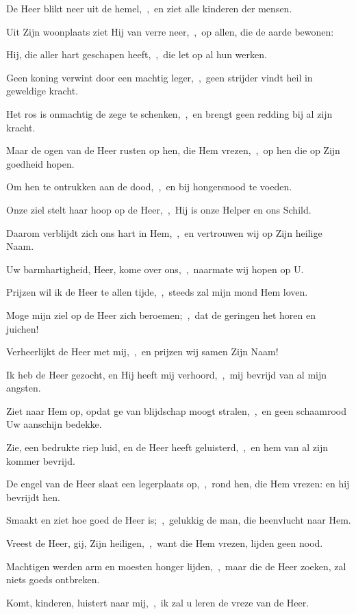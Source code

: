 \documentclass[12pt,twoside,a5paper]{article}
\begin{document}
\begin{halfparskip}
  De Heer blikt neer uit de hemel,~\sep\ en ziet alle kinderen der mensen.

  Uit Zijn woonplaats ziet Hij van verre neer,~\sep\ op allen, die de aarde bewonen:

  Hij, die aller hart geschapen heeft,~\sep\ die let op al hun werken.

  Geen koning verwint door een machtig leger,~\sep\ geen strijder vindt heil in geweldige kracht.

  Het ros is onmachtig de zege te schenken,~\sep\ en brengt geen redding bij al zijn kracht.

  Maar de ogen van de Heer rusten op hen, die Hem vrezen,~\sep\ op hen die op Zijn goedheid hopen.

  Om hen te ontrukken aan de dood,~\sep\ en bij hongersnood te voeden.

  Onze ziel stelt haar hoop op de Heer,~\sep\ Hij is onze Helper en ons Schild.

  Daarom verblijdt zich ons hart in Hem,~\sep\ en vertrouwen wij op Zijn heilige Naam.

  Uw barmhartigheid, Heer, kome over ons,~\sep\ naarmate wij hopen op U.

   Prijzen wil ik de Heer te allen tijde,~\sep\ steeds zal mijn mond Hem loven.

  Moge mijn ziel op de Heer zich beroemen;~\sep\ dat de geringen het horen en juichen!

  Verheerlijkt de Heer met mij,~\sep\ en prijzen wij samen Zijn Naam!

  Ik heb de Heer gezocht, en Hij heeft mij verhoord,~\sep\ mij bevrijd van al mijn angsten.

  Ziet naar Hem op, opdat ge van blijdschap moogt stralen,~\sep\ en geen schaamrood Uw aanschijn bedekke.

  Zie, een bedrukte riep luid, en de Heer heeft geluisterd,~\sep\ en hem van al zijn kommer bevrijd.

  De engel van de Heer slaat een legerplaats op,~\sep\ rond hen, die Hem vrezen: en hij bevrijdt hen.

  Smaakt en ziet hoe goed de Heer is;~\sep\ gelukkig de man, die heenvlucht naar Hem.

  Vreest de Heer, gij, Zijn heiligen,~\sep\ want die Hem vrezen, lijden geen nood.

  Machtigen werden arm en moesten honger lijden,~\sep\ maar die de Heer zoeken, zal niets goeds ontbreken.

  Komt, kinderen, luistert naar mij,~\sep\ ik zal u leren de vreze van de Heer.


\end{halfparskip}
\end{document}
